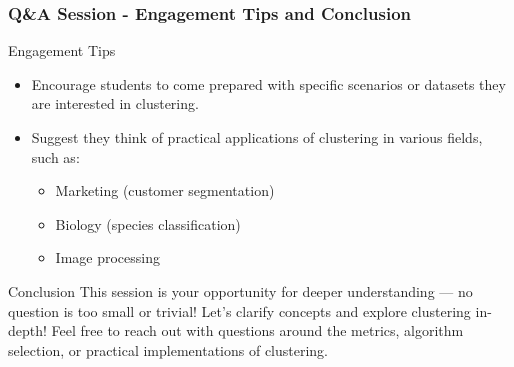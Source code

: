 \documentclass[aspectratio=169]{beamer}
\begin{document}
\begin{frame}[fragile]
  \frametitle{Q\&A Session - Engagement Tips and Conclusion}
  
  \begin{block}{Engagement Tips}
    \begin{itemize}
      \item Encourage students to come prepared with specific scenarios or datasets they are interested in clustering.
      \item Suggest they think of practical applications of clustering in various fields, such as:
        \begin{itemize}
          \item Marketing (customer segmentation)
          \item Biology (species classification)
          \item Image processing
        \end{itemize}
    \end{itemize}
  \end{block}

  \begin{block}{Conclusion}
    This session is your opportunity for deeper understanding — no question is too small or trivial! Let's clarify concepts and explore clustering in-depth! Feel free to reach out with questions around the metrics, algorithm selection, or practical implementations of clustering.
  \end{block}

\end{frame}
\end{document}

